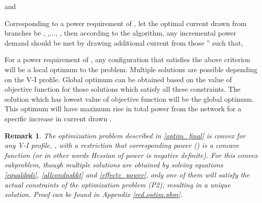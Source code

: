 \documentclass[twocolumn]{autart}
\newtheorem{remark}{Remark}
\begin{document}
and

Corresponding to a power requirement of , let the optimal current drawn from branches be , ,...,  , then according to the algorithm, any incremental power demand  should be met by drawing additional current from those '' such that,

For a power requirement of , any configuration that satisfies the above criterion will be a local optimum to the problem. Multiple solutions are possible depending on the V-I profile. Global optimum can be obtained based on the value of objective function for those solutions which satisfy all these constraints. The solution which has lowest value of objective function will be the global optimum. This optimum will have maximum rise in total power from the network for a specific increase in current drawn . 
\begin{remark}
The optimization problem described in \eqref{optim_final} is convex for any V-I profile, , with a restriction that corresponding power () is a concave function (or in other words Hessian of power is negative definite). For this convex subproblem, though multiple solutions are obtained by solving equations \eqref{equaldpdi}, \eqref{allcondnskkt} and \eqref{effectv_power}, only one of them will satisfy the actual constraints of the optimization problem (P2), resulting in a unique solution. Proof can be found in Appendix \ref{red.optim.pbm}.
\end{remark}
\end{document}
